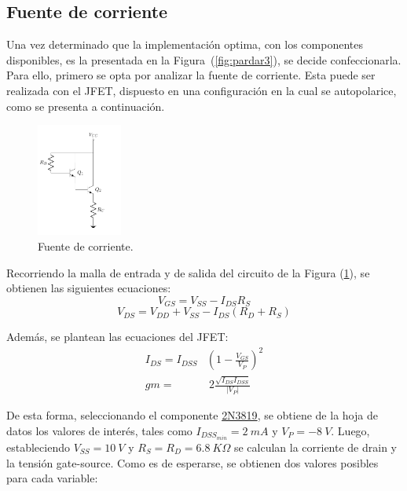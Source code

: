 \subsection{Fuente de corriente}
\label{subsec:fdei}
Una vez determinado que la implementación optima, con los componentes disponibles, es la presentada en la Figura~(\ref{fig:pardar3}), se decide confeccionarla. Para ello, primero se opta por analizar la fuente de corriente. Esta puede ser realizada con el JFET, dispuesto en una configuración en la cual se autopolarice, como se presenta a continuación.
\begin{figure}[H]
\centering
	\includegraphics[width=0.25\textwidth, page=4]{Imagenes/ParDarlington.pdf}
	\caption{Fuente de corriente.}
	\label{fig:fuentei}
\end{figure}

Recorriendo la malla de entrada y de salida del circuito de la Figura (\ref{fig:fuentei}), se obtienen las siguientes ecuaciones:
\begin{equation}
	V_{GS} = V_{SS} - I_{DS} R_{S}
\end{equation}
\begin{equation}
	V_{DS} = V_{DD} + V_{SS} - I_{DS} \left( R_{D} + R_{S} \right)
\end{equation}

Además, se plantean las ecuaciones del JFET:
\begin{equation}
\begin{split}
	I_{DS} = I_{DSS} & \left( 1 - \frac{V_{GS}}{V_P} \right)^2 \\
	gm = & \ 2\frac{\sqrt{I_{DS} I_{DSS}}}{|V_P|}
\end{split}
\end{equation}

De esta forma, seleccionando el componente \href{https://www.onsemi.com/pub/Collateral/2N3819-D.PDF}{2N3819}, se obtiene de la hoja de datos los valores de interés, tales como $I_{DSS_{min}} = 2 \ mA$ y $V_P = -8 \ V$. Luego, estableciendo $V_{SS} = 10 \ V$ y $R_S = R_D = 6.8 \ K\Omega$ se calculan la corriente de drain y la tensión gate-source. Como es de esperarse, se obtienen dos valores posibles para cada variable:

